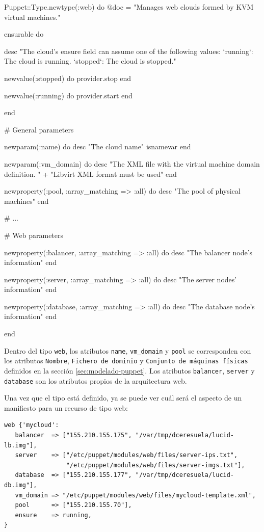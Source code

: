 \begin{rubycode}
Puppet::Type.newtype(:web) do
   @doc = "Manages web clouds formed by KVM virtual machines."
   
   
   ensurable do

      desc "The cloud's ensure field can assume one of the following values:
   `running`: The cloud is running.
   `stopped`: The cloud is stopped.\n"
   
      newvalue(:stopped) do
         provider.stop
      end

      newvalue(:running) do
         provider.start
      end

   end


   # General parameters
   
   newparam(:name) do
      desc "The cloud name"
      isnamevar
   end
   
   newparam(:vm_domain) do
      desc "The XML file with the virtual machine domain definition. " +
           "Libvirt XML format must be used"
   end
   
   newproperty(:pool, :array_matching => :all) do
      desc "The pool of physical machines"
   end

   # ...


   # Web parameters
   
   newproperty(:balancer, :array_matching => :all) do
      desc "The balancer node's information"
   end
   
   newproperty(:server, :array_matching => :all) do
      desc "The server nodes' information"
   end
   
   newproperty(:database, :array_matching => :all) do
      desc "The database node's information"
   end

end

\end{rubycode}

Dentro del tipo \texttt{web}, los atributos \texttt{name}, \texttt{vm\_domain} y \texttt{pool} se corresponden con los atributos \texttt{Nombre}, \texttt{Fichero de dominio} y \texttt{Conjunto de máquinas físicas} definidos en la sección \ref{sec:modelado-puppet}. Los atributos \texttt{balancer}, \texttt{server} y \texttt{database} son los atributos propios de la arquitectura web.

Una vez que el tipo está definido, ya se puede ver cuál será el aspecto de un manifiesto para un recurso de tipo web:


\begin{lstlisting}
web {'mycloud':
   balancer  => ["155.210.155.175", "/var/tmp/dceresuela/lucid-lb.img"],
   server    => ["/etc/puppet/modules/web/files/server-ips.txt",
                 "/etc/puppet/modules/web/files/server-imgs.txt"],
   database  => ["155.210.155.177", "/var/tmp/dceresuela/lucid-db.img"],
   vm_domain => "/etc/puppet/modules/web/files/mycloud-template.xml",
   pool      => ["155.210.155.70"],
   ensure    => running,
}
\end{lstlisting}

